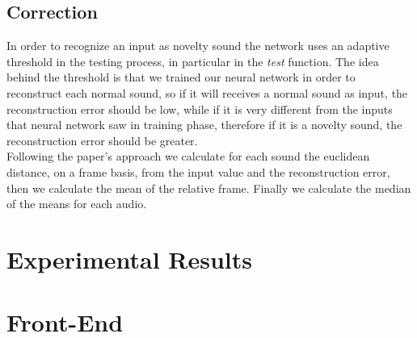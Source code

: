 \documentclass[10pt]{article}
\begin{document}
	
	\subsection{Correction}
	
	In order to recognize an input as novelty sound the network uses an adaptive threshold in the testing process, in particular in the \textit{test} function. The idea behind the threshold is that we trained our neural network in order 
	to reconstruct each normal sound, so if it will receives a normal sound as input, the reconstruction error should be low, while if it is very different from the inputs that neural network  saw in training phase, therefore if it is a novelty sound, the reconstruction error should be greater. \\
	
	Following the paper's approach we calculate for each sound the euclidean distance, on a frame basis, from the input value and the reconstruction error, then we calculate the mean of the relative frame. Finally we calculate the median of the means for each audio.
	
	
	\section{Experimental Results}	
	\section{Front-End}	
\end{document}

